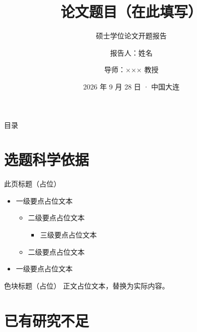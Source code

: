 \documentclass[aspectratio=169,11pt]{beamer}
\title{论文题目（在此填写）}
\subtitle{硕士学位论文开题报告}
\author{报告人：姓名 \and 导师：××× 教授}
\institute{大连海事大学 · 交通运输工程学院}
\date{2026 年 9 月 28 日 · 中国大连}
\begin{document}
\begin{coverframe}
  \titlepage
\end{coverframe}

\begin{frame}{目录}
  \begin{dmuoutline}
  \end{dmuoutline}
\end{frame}

\section{选题科学依据}

\begin{frame}{此页标题（占位）}
  \begin{itemize}
    \item 一级要点占位文本
      \begin{itemize}
        \item 二级要点占位文本
          \begin{itemize}
            \item 三级要点占位文本
          \end{itemize}
        \item 二级要点占位文本
      \end{itemize}
    \item 一级要点占位文本
  \end{itemize}
  \vskip2mm
  \begin{block}{色块标题（占位）}
    正文占位文本，替换为实际内容。
  \end{block}
\end{frame}

\section{已有研究不足}
\end{document}
